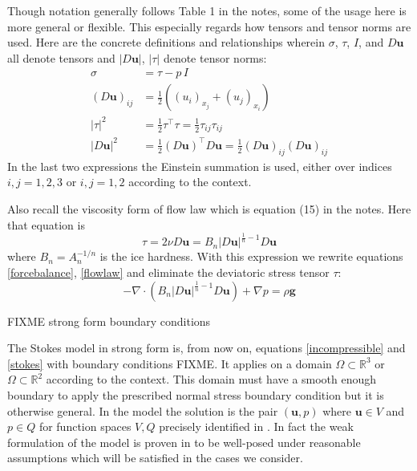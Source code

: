 \documentclass[letterpaper,final,12pt,reqno]{amsart}
\newcommand{\RR}{\mathbb{R}}
\newcommand{\bu}{\mathbf{u}}
\begin{document}
Though notation generally follows Table 1 in the notes, some of the usage here is more general or flexible.  This especially regards how tensors and tensor norms are used.  Here are the concrete definitions and relationships wherein $\sigma$, $\tau$, $I$, and $D\bu$ all denote tensors and $|D\bu|$, $|\tau|$ denote tensor norms:
\begin{align*}
\sigma &= \tau - p\,I \\
(D\bu)_{ij} &= \frac{1}{2} \left((u_i)_{x_j} + (u_j)_{x_i}\right) \\
|\tau|^2 &= \frac{1}{2} \tau^\top \tau = \frac{1}{2} \tau_{ij} \tau_{ij} \\
|D\bu|^2 &= \frac{1}{2} (D\bu)^\top D\bu = \frac{1}{2} (D\bu)_{ij} (D\bu)_{ij}
\end{align*}
In the last two expressions the Einstein summation is used, either over indices $i,j=1,2,3$ or $i,j=1,2$ according to the context.

Also recall the viscosity form of flow law which is equation (15) in the notes.  Here that equation is
\begin{equation}
\tau = 2\nu D\bu = B_n |D\bu|^{\frac{1}{n} - 1} D\bu  \label{viscflowlaw}
\end{equation}
where $B_n = A_n^{-1/n}$ is the ice hardness.  With this expression we rewrite equations \eqref{forcebalance}, \eqref{flowlaw} and eliminate the deviatoric stress tensor $\tau$:
\begin{equation}
- \nabla \cdot \left(B_n |D\bu|^{\frac{1}{n} - 1} D\bu\right) + \nabla p = \rho \mathbf{g} \label{stokes}
\end{equation}

FIXME strong form boundary conditions

The Stokes model in strong form is, from now on, equations \eqref{incompressible} and \eqref{stokes} with boundary conditions FIXME.  It applies on a domain $\Omega\subset \RR^3$ or $\Omega \subset \RR^2$ according to the context.  This domain must have a smooth enough boundary to apply the prescribed normal stress boundary condition but it is otherwise general.  In the model the solution is the pair $(\bu,p)$ where $\bu\in V$ and $p \in Q$ for function spaces $V,Q$ precisely identified in \cite{JouvetRappaz2011}.  In fact the weak formulation of the model is proven in \cite{JouvetRappaz2011} to be well-posed under reasonable assumptions which will be satisfied in the cases we consider.
\end{document}

